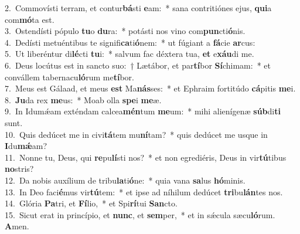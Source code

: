 {2.~}Commovísti terram, et contur\textbf{bá}sti \textbf{e}am:~* sana contritiónes ejus, \textbf{qui}a com\textbf{mó}ta est.\\
{3.~}Ostendísti pópulo \textbf{tu}o \textbf{du}ra:~* potásti nos vino com\textbf{pun}cti\textbf{ó}nis.\\
{4.~}Dedísti metuéntibus te signifi\textbf{ca}ti\textbf{ó}nem:~* ut fúgiant a \textbf{fá}cie \textbf{ar}cus:\\
{5.~}Ut liberéntur di\textbf{lé}cti \textbf{tu}i:~* salvum fac déxtera tua, \textbf{et} e\textbf{xáu}di me.\\
{6.~}Deus locútus est in sancto suo:~† Lætábor, et par\textbf{tí}bor \textbf{Sí}chimam:~* et convállem tabernacu\textbf{ló}rum me\textbf{tí}bor.\\
{7.~}Meus est Gálaad, et meus \textbf{est} Ma\textbf{nás}ses:~* et Ephraim fortitúdo \textbf{cá}pitis \textbf{me}i.\\
{8.~}\textbf{Ju}da rex \textbf{me}us:~* Moab olla \textbf{spe}i \textbf{me}æ.\\
{9.~}In Idumǽam exténdam calcea\textbf{mén}tum \textbf{me}um:~* mihi alienígenæ \textbf{súb}di\textbf{ti} sunt.\\
{10.~}Quis dedúcet me in civi\textbf{tá}tem mu\textbf{ní}tam?~* quis dedúcet me usque in \textbf{I}du\textbf{mǽ}am?\\
{11.~}Nonne tu, Deus, qui \textbf{re}pu\textbf{lí}sti nos?~* et non egrediéris, Deus in vir\textbf{tú}tibus \textbf{no}stris?\\
{12.~}Da nobis auxílium de tribu\textbf{la}ti\textbf{ó}ne:~* quia vana \textbf{sa}lus \textbf{hó}minis.\\
{13.~}In Deo faci\textbf{é}mus vir\textbf{tú}tem:~* et ipse ad níhilum dedúcet \textbf{tri}bu\textbf{lán}tes nos.\\
{14.~}Glória \textbf{Pa}tri, et \textbf{Fí}lio,~* et Spi\textbf{rí}tui \textbf{San}cto.\\
{15.~}Sicut erat in princípio, et \textbf{nunc}, et \textbf{sem}per,~* et in sǽcula sæcu\textbf{ló}rum. \textbf{A}men.\\
